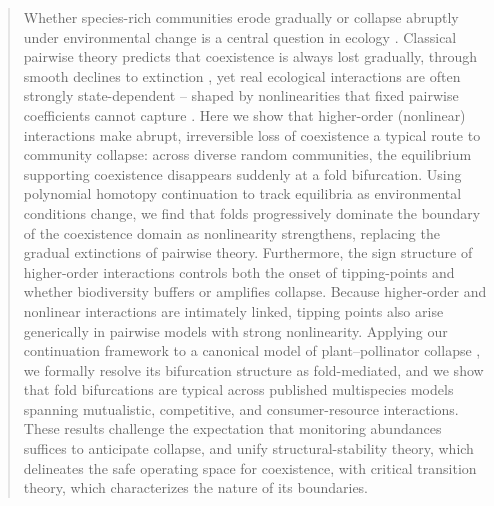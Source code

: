 \documentclass[
 reprint,
 amsmath,
 amssymb,
 aps,
 superscriptaddress,
]{revtex4-2}
\begin{document}
\begin{abstract}

Whether species-rich communities erode gradually or collapse abruptly under environmental change is a central question in ecology \cite{scheffer_anticipating_2012}. Classical pairwise theory predicts that coexistence is always lost gradually, through smooth declines to extinction \cite{grilli_feasibility_2017}, yet real ecological interactions are often strongly state-dependent -- shaped by nonlinearities that fixed pairwise coefficients cannot capture \cite{levine_beyond_2017}. Here we show that higher-order (nonlinear) interactions make abrupt, irreversible loss of coexistence a typical route to community collapse: across diverse random communities, the equilibrium supporting coexistence disappears suddenly at a fold bifurcation. 
Using polynomial homotopy continuation \cite{breiding_homotopycontinuationjl_2018} to track equilibria as environmental conditions change, we find that folds progressively dominate the boundary of the coexistence domain as nonlinearity strengthens, replacing the gradual extinctions of pairwise theory. Furthermore, the sign structure of higher-order interactions controls both the onset of tipping-points and whether biodiversity buffers or amplifies collapse. Because higher-order and nonlinear interactions are intimately linked, tipping points also arise generically in pairwise models with strong nonlinearity. Applying our continuation framework to a canonical model of plant–pollinator collapse \cite{lever_sudden_2014}, we formally resolve its bifurcation structure as fold-mediated, and we show that fold bifurcations are typical across published multispecies models spanning mutualistic, competitive, and consumer-resource interactions. These results challenge the expectation that monitoring abundances suffices to anticipate collapse, and unify structural-stability theory, which delineates the safe operating space for coexistence, with critical transition theory, which characterizes the nature of its boundaries.

\end{abstract}

\maketitle

\vspace{0.5cm}
\end{document}
